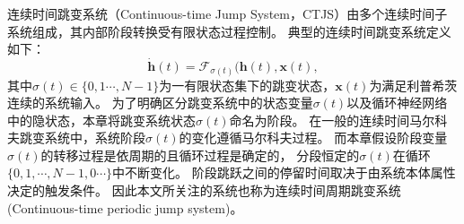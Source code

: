 连续时间跳变系统（Continuous-time Jump System，CTJS）由多个连续时间子系统组成，其内部阶段转换受有限状态过程控制\cite{8709809}。
典型的连续时间跳变系统定义如下：
\begin{equation}
    \dot{\boldsymbol h}(t)=\mathcal{F}_{\sigma(t)}(\boldsymbol h(t), \boldsymbol x(t),
    \label{equ:ctjls}
\end{equation}
其中$\sigma(t)\in\{0,1\cdots,N-1\}$为一有限状态集下的跳变状态，$\boldsymbol{x}(t)$为满足利普希茨连续的系统输入。
为了明确区分跳变系统中的状态变量$\sigma(t)$以及循环神经网络中的隐状态，本章将跳变系统状态$\sigma(t)$命名为阶段。
在一般的连续时间马尔科夫跳变系统中，系统阶段$\sigma(t)$的变化遵循马尔科夫过程。
而本章假设阶段变量$\sigma(t)$的转移过程是依周期的且循环过程是确定的，
分段恒定的$\sigma(t)$在循环$\{0,1,\cdots,N-1,0 \cdots\}$中不断变化。
阶段跳跃之间的停留时间取决于由系统本体属性决定的触发条件。
因此本文所关注的系统也称为连续时间周期跳变系统(Continuous-time periodic jump system)。

